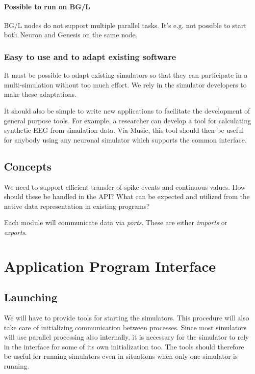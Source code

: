 \documentclass[a4paper]{report}
\begin{document}
\subsubsection{Possible to run on BG/L}

BG/L nodes do not support multiple parallel tasks.  It's e.g. not
possible to start both Neuron and Genesis on the same node.


\subsection{Easy to use and to adapt existing software}

It must be possible to adapt existing simulators so that they can
participate in a multi-simulation without too much effort.  We rely in
the simulator developers to make these adaptations.

It should also be simple to write new applications to facilitate the
development of general purpose tools.  For example, a researcher can
develop a tool for calculating synthetic EEG from simulation data.
Via Music, this tool should then be useful for anybody using any
neuronal simulator which supports the common interface.


\section{Concepts}

We need to support efficient transfer of spike events and continuous
values.  How should these be handled in the API?  What can be expected
and utilized from the native data representation in existing programs?

Each module will communicate data via \emph{ports}.  These are either
\emph{imports} or \emph{exports}.


\chapter{Application Program Interface}

\section{Launching}

We will have to provide tools for starting the simulators.  This
procedure will also take care of initializing communication between
processes.  Since most simulators will use parallel processing also
internally, it is necessary for the simulator to rely in the interface
for some of its own initialization too.  The tools should therefore be
useful for running simulators even in situations when only one
simulator is running.
\end{document}
